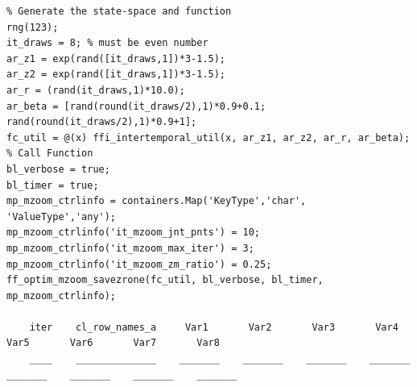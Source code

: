 \documentclass[
]{book}
\begin{document}
\begin{verbatim}
% Generate the state-space and function
rng(123);
it_draws = 8; % must be even number
ar_z1 = exp(rand([it_draws,1])*3-1.5);
ar_z2 = exp(rand([it_draws,1])*3-1.5);
ar_r = (rand(it_draws,1)*10.0);
ar_beta = [rand(round(it_draws/2),1)*0.9+0.1; rand(round(it_draws/2),1)*0.9+1]; 
fc_util = @(x) ffi_intertemporal_util(x, ar_z1, ar_z2, ar_r, ar_beta);
% Call Function
bl_verbose = true;
bl_timer = true;
mp_mzoom_ctrlinfo = containers.Map('KeyType','char', 'ValueType','any');
mp_mzoom_ctrlinfo('it_mzoom_jnt_pnts') = 10;
mp_mzoom_ctrlinfo('it_mzoom_max_iter') = 3;
mp_mzoom_ctrlinfo('it_mzoom_zm_ratio') = 0.25;
ff_optim_mzoom_savezrone(fc_util, bl_verbose, bl_timer, mp_mzoom_ctrlinfo);

    iter    cl_row_names_a     Var1       Var2       Var3       Var4       Var5       Var6       Var7       Var8  
    ____    ______________    _______    _______    _______    _______    _______    _______    _______    _______


\end{verbatim}
\end{document}
